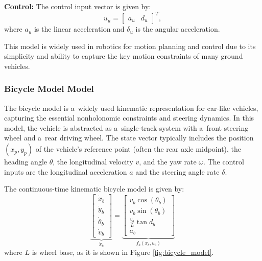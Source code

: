 \documentclass{svproc}
\begin{document}
        \textbf{Control:}
        The control input vector is given by:
        \[
            u_{u} = 
            \begin{bmatrix}
                a_{u} & d_{u}
            \end{bmatrix}^{T},
        \]
        where $a_{u}$ is the linear acceleration and $\delta_{u}$ is the angular
        acceleration.

        This model is widely used in robotics for motion planning and control
        due to its simplicity and ability to capture the key motion constraints
        of many ground vehicles.        

        \subsubsection{Bicycle Model Model}
        The bicycle model is a~widely used kinematic representation for car-like
        vehicles, capturing the essential nonholonomic constraints and steering
        dynamics. In this model, the vehicle is abstracted as a~single-track
        system with a~front steering wheel and a~rear driving wheel. The state
        vector typically includes the position $(x_p, y_p)$ of the vehicle's
        reference point (often the rear axle midpoint), the heading angle
        $\theta$, the longitudinal velocity $v$, and the yaw rate $\omega$. The
        control inputs are the longitudinal acceleration $a$ and the steering
        angle rate $\delta$.

        The continuous-time kinematic bicycle model is given by:
        \begin{equation}
            \label{eq:bicycle_model}
            \underbrace{
            \begin{bmatrix}
                \dot{x}_{b}\\
                \dot{y}_{b}\\
                \dot{\theta}_{b}\\
                \dot{v}_{b}
            \end{bmatrix}
            }_{\dot{x}_{b}}
            =
            \underbrace{
            \begin{bmatrix}
                v_{b}\cos{(\theta_{b})}\\
                v_{b}\sin{(\theta_{b})}\\
                \frac{v_{b}}{L}\tan{d_{b}}\\
                a_{b}
            \end{bmatrix}
            }_{f_{b}(x_{b}, u_{b})}
        \end{equation}
        where $L$ is wheel base, as it is shown in Figure
        \ref{fig:bicycle_model}.
        
\end{document}
